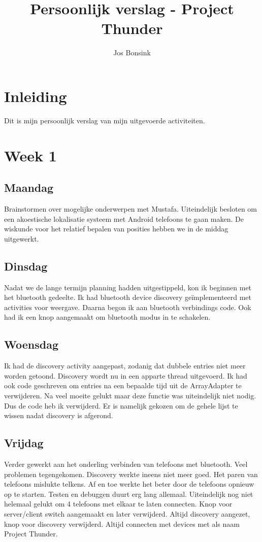 \documentclass[12pt]{article}
\author{Jos Bonsink}
\begin{document}
\title{Persoonlijk verslag - Project Thunder}
\maketitle

\section*{Inleiding}
Dit is mijn persoonlijk verslag van mijn uitgevoerde activiteiten.

\section*{Week 1}
\subsection*{Maandag}
Brainstormen over mogelijke onderwerpen met Mustafa. Uiteindelijk besloten om een 
akoestische lokalisatie systeem met Android telefoons te gaan maken. De wiskunde voor het relatief bepalen van posities hebben we in de middag uitgewerkt.

\subsection*{Dinsdag}
Nadat we de lange termijn planning hadden uitgestippeld, kon ik beginnen met het bluetooth gedeelte. Ik had bluetooth device discovery geïmplementeerd met activities voor weergave. Daarna begon ik aan bluetooth verbindings code.
Ook had ik een knop aangemaakt om bluetooth modus in te schakelen.

\subsection*{Woensdag}
Ik had de discovery activity aangepast, zodanig dat dubbele entries niet meer worden getoond. Discovery wordt nu in een apparte thread uitgevoerd. Ik had ook code geschreven om entries na een bepaalde tijd uit de ArrayAdapter te verwijderen. Na veel moeite gelukt maar deze functie was uiteindelijk niet nodig. Dus de code heb ik verwijderd. Er is namelijk gekozen om de gehele lijst te wissen nadat discovery is afgerond.

\subsection*{Vrijdag}
Verder gewerkt aan het onderling verbinden van telefoons met bluetooth. Veel problemen tegengekomen. Discovery werkte ineens niet meer goed. Het paren van telefoons mislukte telkens. Af en toe werkte het beter door de telefoons opnieuw op te starten. Testen en debuggen duurt erg lang allemaal. Uiteindelijk nog niet helemaal gelukt om 4 telefoons met elkaar te laten connecten. Knop voor server/client switch aangemaakt en later verwijderd. Altijd discovery aangezet, knop voor discovery verwijderd. Altijd connecten met devices met als naam Project Thunder.
\end{document}
